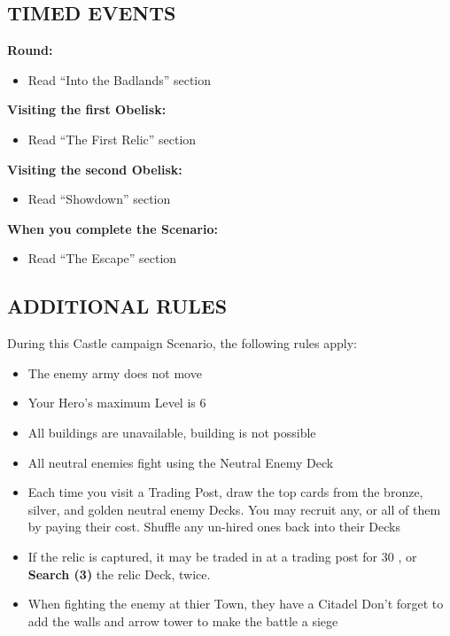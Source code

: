 \begin{multicols}{2}

\subsection*{\MakeUppercase{Timed Events}}

\textbf{ Round:}
\begin{itemize}
  \item Read ``Into the Badlands'' section
\end{itemize}

\textbf{Visiting the first Obelisk:}
\begin{itemize}
  \item Read ``The First Relic'' section
\end{itemize}

\textbf{Visiting the second Obelisk:}
\begin{itemize}
  \item Read ``Showdown'' section
\end{itemize}

\textbf{When you complete the Scenario:}
\begin{itemize}
  \item Read ``The Escape'' section
\end{itemize}



\subsection*{\MakeUppercase{Additional rules}}

During this Castle campaign Scenario, the following rules apply:

\begin{itemize}
  \item The enemy army does not move
  \item Your Hero's maximum Level is 6
  \item All buildings are unavailable, building is not possible
\end{itemize}

\columnbreak

\begin{itemize}
\item All neutral enemies fight using the Neutral Enemy Deck
\item Each time you visit a Trading Post, draw the top cards from the  bronze,  silver, and  golden neutral enemy Decks. 
You may recruit any, or all of them by paying their cost.
Shuffle any un-hired ones back into their Decks
\item If the relic is captured, it may be traded in at a trading post for 30 , or \textbf{Search (3)} the relic Deck, twice.
\item When fighting the enemy at thier Town, they have a Citadel
Don't forget to add the walls and arrow tower to make the battle a siege
\end{itemize}

\end{multicols}

